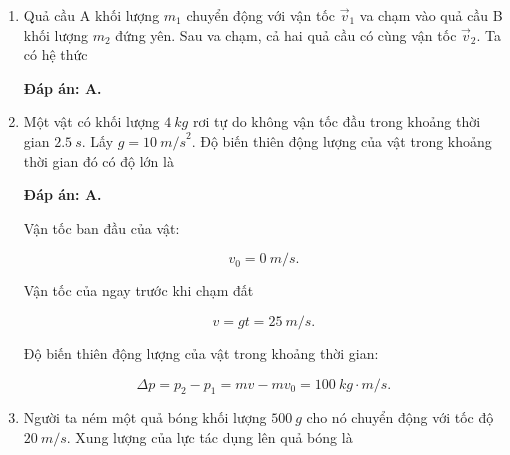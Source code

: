 \begin{enumerate}[label=\bfseries Câu \arabic*:, leftmargin=1.5cm]
{}

	\item {}
	
	
	{	Quả cầu A khối lượng $m_1$ chuyển động với vận tốc $\vec v_1$ va chạm vào quả cầu B khối lượng $m_2$ đứng yên. Sau va chạm, cả hai quả cầu có cùng vận tốc $\vec v_2$. Ta có hệ thức
	}
	
	\hideall
	{	
		\textbf{Đáp án: A.}
	}
	\item {}
	
	
	{Một vật có khối lượng $\SI{4}{kg}$ rơi tự do không vận tốc đầu trong khoảng thời gian $\SI{2,5}{s}$. Lấy $g = \SI{10}{m/s}^2$. Độ biến thiên động lượng của vật trong khoảng thời gian đó có độ lớn là
	}
	
	\hideall
	{	
		\textbf{Đáp án: A.}
		
		Vận tốc ban đầu của vật: 
		
		$$v_0 = \SI{0}{m/s}.$$
		
		Vận tốc của ngay trước khi chạm đất
		
		$$v =gt = \SI{25}{m/s}.$$
		
		Độ biến thiên động lượng của vật trong khoảng thời gian:
		
		$$\Delta p = p_2 - p_1 = mv -mv_0 = \SI{100}{kg \cdot m/s}.$$
		
	}
	\item {}
	
	
	{Người ta ném một quả bóng khối lượng $\SI{500}{g}$ cho nó chuyển động với tốc độ $\SI{20}{m/s}$. Xung lượng của lực tác dụng lên quả bóng là
	}
	

\end{enumerate}
